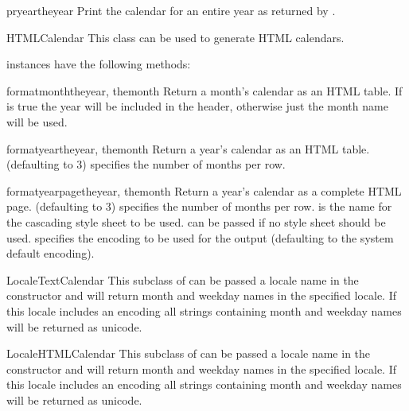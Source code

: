 \begin{methoddesc}{pryear}{theyear}
Print the calendar for an entire year as returned by .
\end{methoddesc}


\begin{classdesc}{HTMLCalendar}{}
This class can be used to generate HTML calendars.

\end{classdesc}

 instances have the following methods:

\begin{methoddesc}{formatmonth}{theyear, themonth}
Return a month's calendar as an HTML table. If  is
true the year will be included in the header, otherwise just the
month name will be used.
\end{methoddesc}

\begin{methoddesc}{formatyear}{theyear, themonth}
Return a year's calendar as an HTML table.  (defaulting to 3)
specifies the number of months per row.
\end{methoddesc}

\begin{methoddesc}{formatyearpage}{theyear, themonth}
Return a year's calendar as a complete HTML page. 
(defaulting to 3) specifies the number of months per row. 
is the name for the cascading style sheet to be used. 
can be passed if no style sheet should be used. 
specifies the encoding to be used for the output (defaulting
to the system default encoding).
\end{methoddesc}


\begin{classdesc}{LocaleTextCalendar}{}
This subclass of  can be passed a locale name in the
constructor and will return month and weekday names in the specified locale.
If this locale includes an encoding all strings containing month and weekday
names will be returned as unicode.
\end{classdesc}


\begin{classdesc}{LocaleHTMLCalendar}{}
This subclass of  can be passed a locale name in the
constructor and will return month and weekday names in the specified locale.
If this locale includes an encoding all strings containing month and weekday
names will be returned as unicode.
\end{classdesc}


